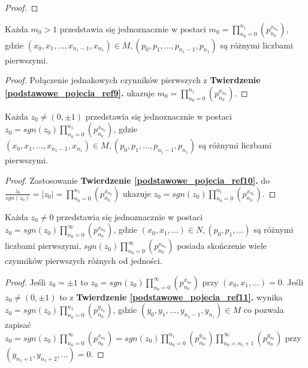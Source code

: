 \begin{appendices}
\begin{theorem}
\begin{proof}
\end{proof}
\end{theorem}
\begin{theorem}
Każda $m_0 > 1$ przedstawia się jednoznacznie w postaci $m_0 = \prod_{n_0 = 0}^{n_1}(p_{n_0}^{x_{n_0}})$, gdzie $(x_0, x_1, ..., x_{n_1 - 1}, x_{n_1}) \in M, (p_0, p_1, ..., p_{n_1 - 1}, p_{n_1})$ są różnymi liczbami pierwszymi.
\begin{proof}
Połączenie jednakowych czynników pierwszych z \textbf{Twierdzenie \ref{podstawowe_pojecia_ref9}.} ukazuje $m_0 = \prod_{n_0 = 0}^{n_1}(p_{n_0}^{x_{n_0}})$.
\end{proof}
\end{theorem}
\begin{theorem}
Każda $z_0 \neq (0, \pm 1)$ przedstawia się jednoznacznie w postaci $z_0 = sgn(z_0)\prod_{n_0 = 0}^{n_1}(p_{n_0}^{x_{n_0}})$, gdzie $(x_0, x_1, ..., x_{n_1 - 1}, x_{n_1}) \in M, (p_0, p_1, ..., p_{n_1 - 1}, p_{n_1})$ są różnymi liczbami pierwszymi.
\begin{proof}
Zastosowanie \textbf{Twierdzenie \ref{podstawowe_pojecia_ref10}.} do $\frac{z_0}{sgn(z_0)} = |z_0| = \prod_{n_0 = 0}^{n_1}(p_{n_0}^{x_{n_0}})$ ukazuje $z_0 = sgn(z_0)\prod_{n_0 = 0}^{n_1}(p_{n_0}^{x_{n_0}})$.
\end{proof}
\end{theorem}
\begin{theorem}
Każda $z_0 \neq 0$ przedstawia się jednoznacznie w postaci $z_0 = sgn(z_0)\prod_{n_0 = 0}^{\infty}(p_{n_0}^{x_{n_0}})$, gdzie $(x_0, x_1, ...) \in N, (p_0, p_1, ...)$ są różnymi liczbami pierwszymi, $sgn(z_0)\prod_{n_0 = 0}^{\infty}(p_{n_0}^{x_{n_0}})$ posiada skończenie wiele czynników pierwszych różnych od jedności.
\begin{proof}
Jeśli $z_0 = \pm 1$ to $z_0 = sgn(z_0)\prod_{n_0 = 0}^{\infty}(p_{n_0}^{x_{n_0}})$ przy $(x_0, x_1, ...) = 0$. Jeśli $z_0 \neq (0, \pm 1)$ to z \textbf{Twierdzenie \ref{podstawowe_pojecia_ref11}.} wynika $z_0 = sgn(z_0)\prod_{n_0 = 0}^{n_1}(p_{n_0}^{y_{n_0}})$, gdzie $(y_0, y_1, ..., y_{n_1 - 1}, y_{n_1}) \in M$ co pozwala zapisać $z_0 = sgn(z_0)\prod_{n_0 = 0}^{\infty}(p_{n_0}^{x_{n_0}}) = sgn(z_0)\prod_{n_0 = 0}^{n_1}(p_{n_0}^{y_{n_0}})\prod_{n_0 = n_1 + 1}^{\infty}(p_{n_0}^{y_{n_0}})$ przy $(y_{n_1 + 1}, y_{n_1 + 2}, ...) = 0$.

\end{proof}
\end{theorem}
\end{appendices}
